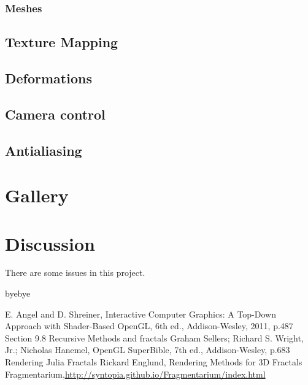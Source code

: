\documentclass[a4paper]{article}
\begin{document}
\subsubsection{Meshes}

\subsection{Texture Mapping}

\subsection{Deformations}

\subsection{Camera control}
\subsection{Antialiasing}


\section{Gallery}
\begin{figure}[H]
\centering
{}
\end{figure}
\section{Discussion}
There are some issues in this project.
\begin{description}[style=nextline]
\item[hihi?]
byebye
\end{description}

\begin{thebibliography}{1}
E. Angel and D. Shreiner, Interactive Computer Graphics: A Top-Down Approach with Shader-Based OpenGL, 6th ed., Addison-Wesley, 2011, p.487 Section 9.8 Recursive Methods and fractals
Graham Sellers; Richard S. Wright, Jr.; Nicholas Hanemel, OpenGL SuperBible, 7th ed., Addison-Wesley, p.683 Rendering Julia Fractals
Rickard Englund, Rendering Methods for 3D Fractals
Fragmentarium,\url{http://syntopia.github.io/Fragmentarium/index.html}
\end{thebibliography}
\end{document}
